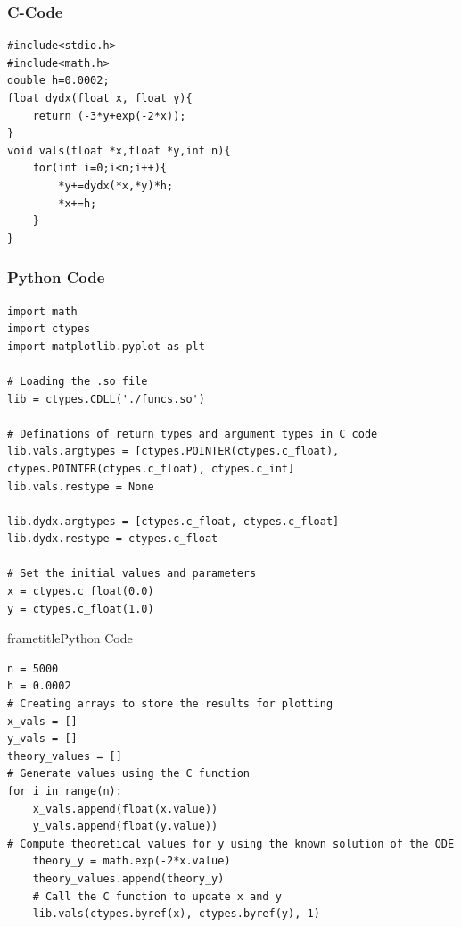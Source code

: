 \documentclass{beamer}
\begin{document}
\begin{frame}[fragile]
\frametitle{C-Code}
\begin{verbatim}
#include<stdio.h>
#include<math.h>
double h=0.0002;
float dydx(float x, float y){
	return (-3*y+exp(-2*x));
}
void vals(float *x,float *y,int n){
	for(int i=0;i<n;i++){
		*y+=dydx(*x,*y)*h;
		*x+=h;
	}
}
\end{verbatim}
\end{frame}
\begin{frame}[fragile]
  \frametitle{Python Code }

\begin{verbatim}
import math
import ctypes
import matplotlib.pyplot as plt

# Loading the .so file
lib = ctypes.CDLL('./funcs.so')

# Definations of return types and argument types in C code
lib.vals.argtypes = [ctypes.POINTER(ctypes.c_float), ctypes.POINTER(ctypes.c_float), ctypes.c_int]
lib.vals.restype = None

lib.dydx.argtypes = [ctypes.c_float, ctypes.c_float]
lib.dydx.restype = ctypes.c_float

# Set the initial values and parameters
x = ctypes.c_float(0.0) 
y = ctypes.c_float(1.0)
\end{verbatim}
\end{frame}
\begin{frame}[fragile]
  frametitle{Python Code }

\begin{verbatim}
n = 5000
h = 0.0002
# Creating arrays to store the results for plotting
x_vals = []
y_vals = []
theory_values = []
# Generate values using the C function
for i in range(n):
    x_vals.append(float(x.value))
    y_vals.append(float(y.value))
# Compute theoretical values for y using the known solution of the ODE
    theory_y = math.exp(-2*x.value)
    theory_values.append(theory_y)  
    # Call the C function to update x and y
    lib.vals(ctypes.byref(x), ctypes.byref(y), 1)

\end{verbatim}
\end{frame}
\end{document}
